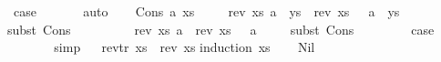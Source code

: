 \begin{isabellebody}
\ {\isacharquery}{\kern0pt}case\ \isanewline
\ \ \ \ \isamarkupfalse%
\ auto\isanewline
{}\isamarkupfalse%
\isanewline
\ \ \isamarkupfalse%
\ {\isacharparenleft}{\kern0pt}Cons\ a\ xs{\isacharparenright}{\kern0pt}\isanewline
\ \ \isamarkupfalse%
\ {}{\isacharcolon}{\kern0pt}\ {\isachardoublequoteopen}rev{\isacharprime}{\kern0pt}\ xs\ {\isacharparenleft}{\kern0pt}a\ {\isacharhash}{\kern0pt}\ ys{\isacharparenright}{\kern0pt}\ {\isacharequal}{\kern0pt}\ {\isacharparenleft}{\kern0pt}rev{\isacharprime}{\kern0pt}\ xs\ {\isacharbrackleft}{\kern0pt}{\isacharbrackright}{\kern0pt}{\isacharparenright}{\kern0pt}\ {\isacharat}{\kern0pt}\ {\isacharparenleft}{\kern0pt}a\ {\isacharhash}{\kern0pt}\ ys{\isacharparenright}{\kern0pt}{\isachardoublequoteclose}\isanewline
\ \ \ \ \isamarkupfalse%
{\isacharparenleft}{\kern0pt}subst\ Cons{\isacharparenright}{\kern0pt}\isanewline
\ \ \ \ \isacommand{{\isachardot}{\kern0pt}{\isachardot}{\kern0pt}}\isamarkupfalse%
\isanewline
\ \ \isamarkupfalse%
\ {}{\isacharcolon}{\kern0pt}\ {\isachardoublequoteopen}rev{\isacharprime}{\kern0pt}\ xs\ {\isacharbrackleft}{\kern0pt}a{\isacharbrackright}{\kern0pt}\ {\isacharequal}{\kern0pt}\ {\isacharparenleft}{\kern0pt}rev{\isacharprime}{\kern0pt}\ xs\ {\isacharbrackleft}{\kern0pt}{\isacharbrackright}{\kern0pt}{\isacharparenright}{\kern0pt}\ {\isacharat}{\kern0pt}\ {\isacharbrackleft}{\kern0pt}a{\isacharbrackright}{\kern0pt}{\isachardoublequoteclose}\isanewline
\ \ \ \ \isamarkupfalse%
{\isacharparenleft}{\kern0pt}subst\ Cons{\isacharparenright}{\kern0pt}\isanewline
\ \ \ \ \isacommand{{\isachardot}{\kern0pt}{\isachardot}{\kern0pt}}\isamarkupfalse%
\isanewline
\ \ \isamarkupfalse%
\ {\isacharquery}{\kern0pt}case\isanewline
\ \ \ \ \isamarkupfalse%
\ {}\ {}\isanewline
\ \ \ \isamarkupfalse%
\ simp\isanewline
{}\isamarkupfalse%
%
\endisatagproof
{\isafoldproof}%
%
\isadelimproof
\isanewline
%
\endisadelimproof
\isanewline
\ \isanewline
{}\isamarkupfalse%
\ {\isachardoublequoteopen}rev{\isacharunderscore}{\kern0pt}tr\ xs\ {\isacharequal}{\kern0pt}\ rev\ xs{\isachardoublequoteclose}\isanewline
%
\isadelimproof
\isanewline
%
\endisadelimproof
%
\isatagproof
{}\isamarkupfalse%
{\isacharparenleft}{\kern0pt}induction\ xs{\isacharparenright}{\kern0pt}\isanewline
\ \ \isamarkupfalse%
\ Nil\isanewline
\ \ \isamarkupfalse%

\end{isabellebody}
